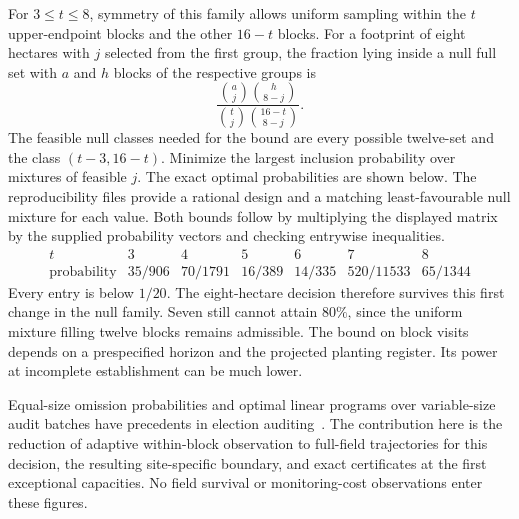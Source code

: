 \documentclass[10pt]{article}
\begin{document}
For $3\leq t\leq8$, symmetry of this family allows uniform sampling within the $t$ upper-endpoint blocks and the other $16-t$ blocks. For a footprint of eight hectares with $j$ selected from the first group, the fraction lying inside a null full set with $a$ and $h$ blocks of the respective groups is
\[
 \frac{{a\choose j}{h\choose 8-j}}{{t\choose j}{16-t\choose 8-j}}.
\]
The feasible null classes needed for the bound are every possible twelve-set and the class $(t-3,16-t)$. Minimize the largest inclusion probability over mixtures of feasible $j$. The exact optimal probabilities are shown below. The reproducibility files provide a rational design and a matching least-favourable null mixture for each value. Both bounds follow by multiplying the displayed matrix by the supplied probability vectors and checking entrywise inequalities.
\[
\begin{array}{c|rrrrrr}
t&3&4&5&6&7&8\\ \hline
\text{probability}&35/906&70/1791&16/389&14/335&520/11533&65/1344
\end{array}
\]
Every entry is below $1/20$. The eight-hectare decision therefore survives this first change in the null family. Seven still cannot attain $80\%$, since the uniform mixture filling twelve blocks remains admissible. The bound on block visits depends on a prespecified horizon and the projected planting register. Its power at incomplete establishment can be much lower.

Equal-size omission probabilities and optimal linear programs over variable-size audit batches have precedents in election auditing~\cite{audit07,audit08}. The contribution here is the reduction of adaptive within-block observation to full-field trajectories for this decision, the resulting site-specific boundary, and exact certificates at the first exceptional capacities. No field survival or monitoring-cost observations enter these figures.
\end{document}
